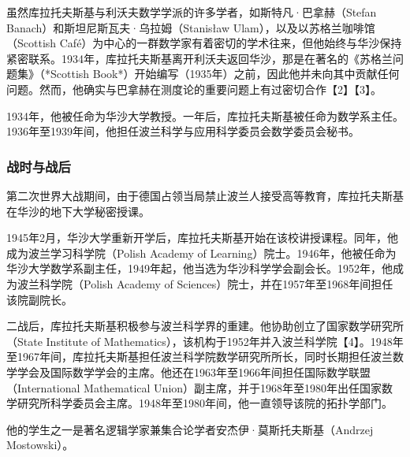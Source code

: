 虽然库拉托夫斯基与利沃夫数学学派的许多学者，如斯特凡·巴拿赫（Stefan Banach）和斯坦尼斯瓦夫·乌拉姆（Stanisław Ulam），以及以苏格兰咖啡馆（Scottish Café）为中心的一群数学家有着密切的学术往来，但他始终与华沙保持紧密联系。1934年，库拉托夫斯基离开利沃夫返回华沙，那是在著名的《苏格兰问题集》（*Scottish Book*）开始编写（1935年）之前，因此他并未向其中贡献任何问题。然而，他确实与巴拿赫在测度论的重要问题上有过密切合作【2】【3】。

1934年，他被任命为华沙大学教授。一年后，库拉托夫斯基被任命为数学系主任。1936年至1939年间，他担任波兰科学与应用科学委员会数学委员会秘书。
\subsubsection{战时与战后}
第二次世界大战期间，由于德国占领当局禁止波兰人接受高等教育，库拉托夫斯基在华沙的地下大学秘密授课。

1945年2月，华沙大学重新开学后，库拉托夫斯基开始在该校讲授课程。同年，他成为波兰学习科学院（Polish Academy of Learning）院士。1946年，他被任命为华沙大学数学系副主任，1949年起，他当选为华沙科学学会副会长。1952年，他成为波兰科学院（Polish Academy of Sciences）院士，并在1957年至1968年间担任该院副院长。

二战后，库拉托夫斯基积极参与波兰科学界的重建。他协助创立了国家数学研究所（State Institute of Mathematics），该机构于1952年并入波兰科学院【4】。1948年至1967年间，库拉托夫斯基担任波兰科学院数学研究所所长，同时长期担任波兰数学学会及国际数学学会的主席。他还在1963年至1966年间担任国际数学联盟（International Mathematical Union）副主席，并于1968年至1980年出任国家数学研究所科学委员会主席。1948年至1980年间，他一直领导该院的拓扑学部门。

他的学生之一是著名逻辑学家兼集合论学者安杰伊·莫斯托夫斯基（Andrzej Mostowski）。
